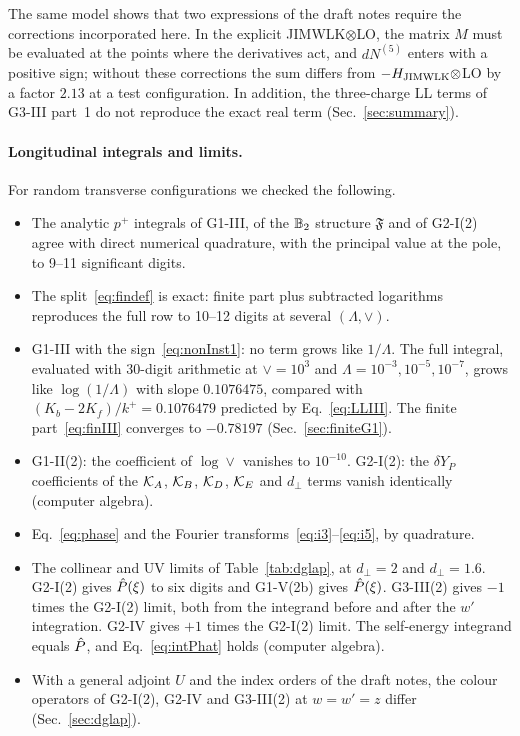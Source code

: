 The same model shows that two expressions of the draft notes require the corrections incorporated here. In the explicit JIMWLK$\otimes$LO, the matrix $M$ must be evaluated at the points where the derivatives act, and $dN^{(5)}$ enters with a positive sign; without these corrections the sum differs from $-H_{\rm JIMWLK}\otimes$LO by a factor $2.13$ at a test configuration. In addition, the three-charge LL terms of G3-III part~1 do not reproduce the exact real term (Sec.~\ref{sec:summary}).

\paragraph*{Longitudinal integrals and limits.} For random transverse configurations we checked the following.
\begin{itemize}
\item The analytic $p^+$ integrals of G1-III, of the $\mathbb{B}_2$ structure $\mathfrak F$ and of G2-I(2) agree with direct numerical quadrature, with the principal value at the pole, to 9--11 significant digits.
\item The split~\eqref{eq:findef} is exact: finite part plus subtracted logarithms reproduces the full row to 10--12 digits at several $(\Lambda,\vee)$.
\item G1-III with the sign~\eqref{eq:nonInst1}: no term grows like $1/\Lambda$. The full integral, evaluated with 30-digit arithmetic at $\vee=10^3$ and $\Lambda=10^{-3},10^{-5},10^{-7}$, grows like $\log(1/\Lambda)$ with slope $0.1076475$, compared with $(K_b-2K_f)/k^+=0.1076479$ predicted by Eq.~\eqref{eq:LLIII}. The finite part~\eqref{eq:finIII} converges to $-0.78197$ (Sec.~\ref{sec:finiteG1}).
\item G1-II(2): the coefficient of $\log\vee$ vanishes to $10^{-10}$. G2-I(2): the $\delta Y_P$ coefficients of the $\mathcal{K}_A$, $\mathcal{K}_B$, $\mathcal{K}_D$, $\mathcal{K}_E$ and $d_\perp$ terms vanish identically (computer algebra).
\item Eq.~\eqref{eq:phase} and the Fourier transforms~\eqref{eq:i3}--\eqref{eq:i5}, by quadrature.
\item The collinear and UV limits of Table~\ref{tab:dglap}, at $d_\perp=2$ and $d_\perp=1.6$. G2-I(2) gives $\hat P(\xi)$ to six digits and G1-V(2b) gives $\hat P(\xi)$. G3-III(2) gives $-1$ times the G2-I(2) limit, both from the integrand before and after the $w'$ integration. G2-IV gives $+1$ times the G2-I(2) limit. The self-energy integrand equals $\hat P$, and Eq.~\eqref{eq:intPhat} holds (computer algebra).
\item With a general adjoint $U$ and the index orders of the draft notes, the colour operators of G2-I(2), G2-IV and G3-III(2) at $w=w'=z$ differ (Sec.~\ref{sec:dglap}).
\end{itemize}
